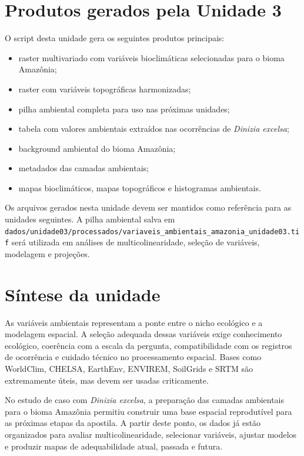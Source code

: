 \documentclass{ueap-sdm}
\begin{document}
\section{Produtos gerados pela Unidade 3}

O script desta unidade gera os seguintes produtos principais:

\begin{itemize}
	\item raster multivariado com variáveis bioclimáticas selecionadas para o bioma Amazônia;
	\item raster com variáveis topográficas harmonizadas;
	\item pilha ambiental completa para uso nas próximas unidades;
	\item tabela com valores ambientais extraídos nas ocorrências de \textit{Dinizia excelsa};
	\item background ambiental do bioma Amazônia;
	\item metadados das camadas ambientais;
	\item mapas bioclimáticos, mapas topográficos e histogramas ambientais.
\end{itemize}

\begin{dica}[title={\faLightbulb\quad Organização dos arquivos}]
	Os arquivos gerados nesta unidade devem ser mantidos como referência para as unidades seguintes. A pilha ambiental salva em \texttt{dados/unidade03/processados/variaveis\_ambientais\_amazonia\_unidade03.tif} será utilizada em análises de multicolinearidade, seleção de variáveis, modelagem e projeções.
\end{dica}

\section{Síntese da unidade}

As variáveis ambientais representam a ponte entre o nicho ecológico e a modelagem espacial. A seleção adequada dessas variáveis exige conhecimento ecológico, coerência com a escala da pergunta, compatibilidade com os registros de ocorrência e cuidado técnico no processamento espacial. Bases como WorldClim, CHELSA, EarthEnv, ENVIREM, SoilGrids e SRTM são extremamente úteis, mas devem ser usadas criticamente.

No estudo de caso com \textit{Dinizia excelsa}, a preparação das camadas ambientais para o bioma Amazônia permitiu construir uma base espacial reprodutível para as próximas etapas da apostila. A partir deste ponto, os dados já estão organizados para avaliar multicolinearidade, selecionar variáveis, ajustar modelos e produzir mapas de adequabilidade atual, passada e futura.
\end{document}
